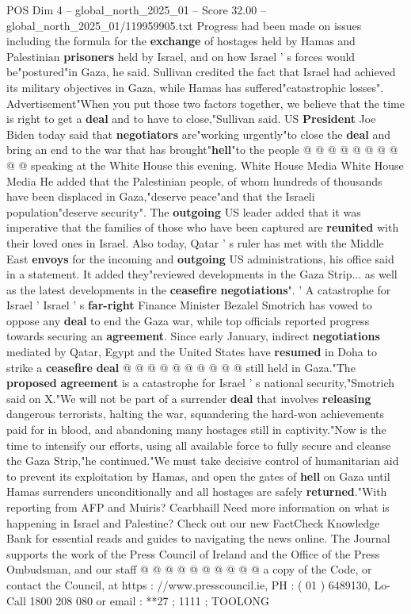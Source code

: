 \begin{textsample}{POS Dim 4 – global\_north\_2025\_01 – Score 32.00 – global\_north\_2025\_01/119959905.txt}
Progress had been made on issues including the formula for the \textbf{exchange} of hostages held by Hamas and Palestinian \textbf{prisoners} held by Israel, and on how Israel ' s forces would be"postured"in Gaza, he said.
Sullivan credited the fact that Israel had achieved its military objectives in Gaza, while Hamas has suffered"catastrophic losses".
Advertisement"When you put those two factors together, we believe that the time is right to get a \textbf{deal} and to have to close,"Sullivan said.
US \textbf{President} Joe Biden today said that \textbf{negotiators} are"working urgently"to close the \textbf{deal} and bring an end to the war that has brought"\textbf{hell}"to the people @ @ @ @ @ @ @ @ @ @ speaking at the White House this evening.
White House Media White House Media He added that the Palestinian people, of whom hundreds of thousands have been displaced in Gaza,"deserve peace"and that the Israeli population"deserve security".
The \textbf{outgoing} US leader added that it was imperative that the families of those who have been captured are \textbf{reunited} with their loved ones in Israel.
Also today, Qatar ' s ruler has met with the Middle East \textbf{envoys} for the incoming and \textbf{outgoing} US administrations, his office said in a statement.
It added they"reviewed developments in the Gaza Strip... as well as the latest developments in the \textbf{ceasefire} \textbf{negotiations}". ' A catastrophe for Israel ' Israel ' s \textbf{far-right} Finance Minister Bezalel Smotrich has vowed to oppose any \textbf{deal} to end the Gaza war, while top officials reported progress towards securing an \textbf{agreement}.
Since early January, indirect \textbf{negotiations} mediated by Qatar, Egypt and the United States have \textbf{resumed} in Doha to strike a \textbf{ceasefire} \textbf{deal} @ @ @ @ @ @ @ @ @ @ still held in Gaza."The \textbf{proposed} \textbf{agreement} is a catastrophe for Israel ' s national security,"Smotrich said on X."We will not be part of a surrender \textbf{deal} that involves \textbf{releasing} dangerous terrorists, halting the war, squandering the hard-won achievements paid for in blood, and abandoning many hostages still in captivity."Now is the time to intensify our efforts, using all available force to fully secure and cleanse the Gaza Strip,"he continued."We must take decisive control of humanitarian aid to prevent its exploitation by Hamas, and open the gates of \textbf{hell} on Gaza until Hamas surrenders unconditionally and all hostages are safely \textbf{returned}."With reporting from AFP and Muiris?
Cearbhaill Need more information on what is happening in Israel and Palestine?
Check out our new FactCheck Knowledge Bank for essential reads and guides to navigating the news online.
The Journal supports the work of the Press Council of Ireland and the Office of the Press Ombudsman, and our staff @ @ @ @ @ @ @ @ @ @ a copy of the Code, or contact the Council, at https : //www.presscouncil.ie, PH : ( 01 ) 6489130, Lo-Call 1800 208 080 or email : **27 ; 1111 ; TOOLONG


\end{textsample}

